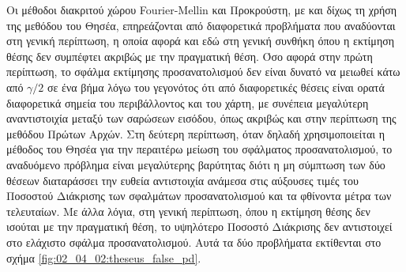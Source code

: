 Οι μέθοδοι διακριτού χώρου Fourier-Mellin και Προκρούστη, με και δίχως τη χρήση
της μεθόδου του Θησέα, επηρεάζονται από διαφορετικά προβλήματα που αναδύονται
στη γενική περίπτωση, η οποία αφορά και εδώ στη γενική συνθήκη όπου η εκτίμηση
θέσης δεν συμπέφτει ακριβώς με την πραγματική θέση. Όσο αφορά στην πρώτη
περίπτωση, το σφάλμα εκτίμησης προσανατολισμού δεν είναι δυνατό να μειωθεί κάτω
από $\gamma/2$ σε ένα βήμα λόγω του γεγονότος ότι από διαφορετικές θέσεις είναι
ορατά διαφορετικά σημεία του περιβάλλοντος και του χάρτη, με συνέπεια
μεγαλύτερη αναντιστοιχία μεταξύ των σαρώσεων εισόδου, όπως ακριβώς και στην
περίπτωση της μεθόδου Πρώτων Αρχών. Στη δεύτερη περίπτωση, όταν δηλαδή
χρησιμοποιείται η μέθοδος του Θησέα για την περαιτέρω μείωση του σφάλματος
προσανατολισμού, το αναδυόμενο πρόβλημα είναι μεγαλύτερης βαρύτητας διότι η μη
σύμπτωση των δύο θέσεων διαταράσσει την ευθεία αντιστοιχία ανάμεσα στις
αύξουσες τιμές του Ποσοστού Διάκρισης των σφαλμάτων προσανατολισμού και τα
φθίνοντα μέτρα των τελευταίων. Με άλλα λόγια, στη γενική περίπτωση, όπου η
εκτίμηση θέσης δεν ισούται με την πραγματική θέση, το υψηλότερο Ποσοστό
Διάκρισης δεν αντιστοιχεί στο ελάχιστο σφάλμα προσανατολισμού. Αυτά τα δύο
προβλήματα εκτίθενται στο σχήμα \ref{fig:02_04_02:theseus_false_pd}.

